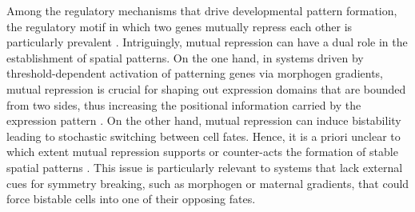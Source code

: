 \documentclass[a4paper,10pt]{article}
\begin{document}

Among the regulatory mechanisms that drive developmental pattern formation, the regulatory motif in which two genes mutually repress each other is particularly prevalent \cite{Balaskas2012,Alon2007,Vakulenko2009,Cotterell2010,Burda2011,Martin2016,Verd2017,Verd2019,Exelby2021}. Intriguingly, mutual repression can have a dual role in the establishment of spatial patterns. On the one hand, in systems driven by threshold-dependent activation of patterning genes via morphogen gradients, mutual repression is crucial for shaping out expression domains that are bounded from two sides, thus increasing the positional information carried by the expression pattern \cite{Sokolowski2012,Sokolowski2015,Zagorski2017,Exelby2021,Sokolowski2023}. On the other hand, mutual repression can induce bistability leading to stochastic switching between cell fates. Hence, it is a priori unclear to which extent mutual repression supports or counter-acts the formation of stable spatial patterns \cite{Sokolowski2012,Zagorski2017,Exelby2021}. This issue is particularly relevant to systems that lack external cues for symmetry breaking, such as morphogen or maternal gradients, that could force bistable cells into one of their opposing fates.
\end{document}
